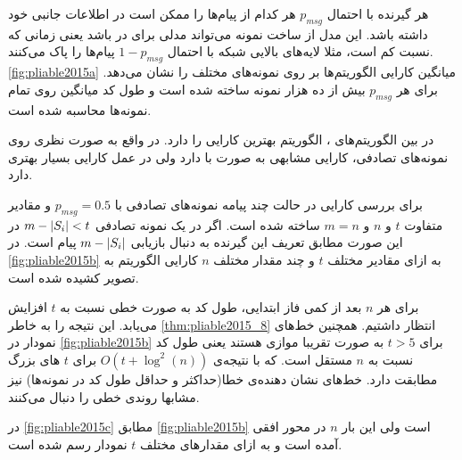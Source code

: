   هر گیرنده با احتمال
  $p_{msg}$
  هر کدام از پیام‌ها را ممکن است در اطلاعات جانبی خود داشته باشد. این مدل از ساخت نمونه می‌تواند مدلی برای 
  در 
   باشد یعنی زمانی که نسبت 
کم است، مثلا لایه‌های بالایی شبکه با احتمال
$1 - p_{msg}$
پیام‌ها را پاک می‌کنند.
\autoref{fig:pliable2015a}
میانگین کارایی الگوریتم‌ها بر روی نمونه‌های مختلف را نشان می‌دهد. برای هر 
$p_{msg}$
بیش از ده هزار نمونه ساخته شده است و طول کد میانگین روی تمام نمونه‌ها محاسبه شده است.
  
  در بین الگوریتم‌های 
  \picod،
  الگوریتم
  بهترین کارایی را دارد. در واقع
     به صورت نظری روی نمونه‌های تصادفی، کارایی مشابهی به صورت 
    با
    دارد ولی در عمل کارایی بسیار بهتری دارد.
    
    برای بررسی کارایی
        در حالت چند پیامه
        نمونه‌های تصادفی با
        $p_{msg} = 0.5$
        و مقادیر متفاوت
        $t$
        و
        $n$
        و
        $m = n$
        ساخته شده است. اگر در یک نمونه‌ تصادفی
        $m - \left|{S_i}\right| < t$
        در این صورت مطابق تعریف این گیرنده به دنبال بازیابی
        $m - \left|{S_i}\right|$
        پیام است. در
        \autoref{fig:pliable2015b}
        به ازای مقادیر مختلف
        $t$
        و چند مقدار مختلف
        $n$
        کارایی الگوریتم به تصویر کشیده شده است.
        
        برای هر
        $n$
        بعد از کمی فاز ابتدایی، طول کد به صورت خطی نسبت به
        $t$
        افزایش می‌یابد. این نتیجه را به خاطر
        \autoref{thm:pliable2015_8}
        انتظار داشتیم. همچنین خط‌های نمودار در
                \autoref{fig:pliable2015b}
                برای
                $t > 5$
                به صورت تقریبا موازی هستند یعنی طول کد نسبت به 
                $n$
                مستقل است. که با نتیجه‌ی
                $O(t + \log^2(n))$
                برای
                $t$
                های بزرگ مطابقت دارد. خط‌های نشان دهنده‌ی خطا(حداکثر و حداقل طول کد در نمونه‌ها) نیز مشابها روندی خطی را دنبال می‌کنند.
                
                در
                \autoref{fig:pliable2015c}
                مطابق
                  \autoref{fig:pliable2015b}
                  است ولی این بار
                  $n$
                  در محور افقی آمده است و به ازای مقدارهای مختلف
                  $t$
                  نمودار رسم شده است.
                  
